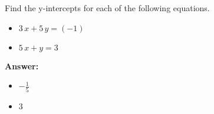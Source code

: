  Find the y-intercepts for each of the following equations. \begin{itemize}\item \( 3 \, x + 5 \, y = \left(-1\right) \)\item \( 5 \, x + y = 3 \)\end{itemize}

        \textbf{Answer:} \begin{itemize}\item \( -\frac{1}{5} \)\item \( 3 \)\end{itemize}
